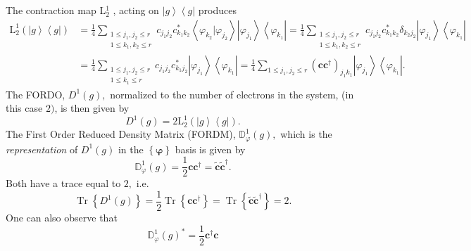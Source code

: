 \documentclass[preprint,aps,showkeys]{revtex4}%
\begin{document}
The contraction map \textrm{L}$_{2}^{1}$ \cite{Weiner84,kummar70,Lowdin55},
acting on $\left\vert g\right\rangle \left\langle g\right\vert $ produces
\begin{align}
\mathrm{L}_{2}^{1}\left(  \left\vert g\right\rangle \left\langle g\right\vert
\right)   &  =\frac{1}{4}\sum_{\substack{1\leq j_{1},j_{2}\leq r\\1\leq
k_{1},k_{2}\leq r}}c_{j_{1}j_{2}}c_{k_{1}k_{2}}^{\ast}\left\langle
\varphi_{k_{2}}|\varphi_{j_{2}}\right\rangle \left\vert \varphi_{j_{1}%
}\right\rangle \left\langle \varphi_{k_{1}}\right\vert =\frac{1}{4}%
\sum_{\substack{1\leq j_{1},j_{2}\leq r\\1\leq k_{1},k_{2}\leq r}%
}c_{j_{1}j_{2}}c_{k_{1}k_{2}}^{\ast}\delta_{k_{2}j_{2}}\left\vert
\varphi_{j_{1}}\right\rangle \left\langle \varphi_{k_{1}}\right\vert
\nonumber\\
&  =\frac{1}{4}\sum_{\substack{1\leq j_{1},j_{2}\leq r\\1\leq k_{1}\leq
r}}c_{j_{1}j_{2}}c_{k_{1}j_{2}}^{\ast}\left\vert \varphi_{j_{1}}\right\rangle
\left\langle \varphi_{k_{1}}\right\vert =\frac{1}{4}\sum_{1\leq j_{1}%
,j_{2}\leq r}\left(  \mathbf{cc}^{\dagger}\right)  _{j_{1}k_{1}}\left\vert
\varphi_{j_{1}}\right\rangle \left\langle \varphi_{k_{1}}\right\vert .
\end{align}
The FORDO, $D^{1}\left(  g\right)  ,$ normalized to the number of electrons in
the system, (in this case $2)$, is then given by
\begin{equation}
D^{1}\left(  g\right)  =2\mathrm{L}_{2}^{1}\left(  \left\vert g\right\rangle
\left\langle g\right\vert \right)  .
\end{equation}
The First Order Reduced Density Matrix (FORDM), $\mathbb{D}_{\varphi}%
^{1}\left(  g\right)  ,$ which is the \emph{representation} of $D^{1}\left(
g\right)  $ in the $\left\{  \mathbf{\varphi}\right\}  $ basis is given by
\begin{equation}
\mathbb{D}_{\varphi}^{1}\left(  g\right)  =\frac{1}{2}\mathbf{cc}^{\dagger
}=\mathbf{\tilde{c}\tilde{c}}^{\dagger}.
\end{equation}
Both have a trace equal to $2,$ i.e.
\begin{equation}
\operatorname{Tr}\left\{  D^{1}\left(  g\right)  \right\}  =\frac{1}%
{2}\operatorname{Tr}\left\{  \mathbf{cc}^{\dagger}\right\}  =\operatorname{Tr}%
\left\{  \mathbf{\tilde{c}\tilde{c}}^{\dagger}\right\}  =2.
\end{equation}
One can also observe that
\begin{equation}
\mathbb{D}_{\varphi}^{1}\left(  g\right)  ^{\ast}=\frac{1}{2}\mathbf{c}%
^{\dagger}\mathbf{c}%
\end{equation}
\end{document}

